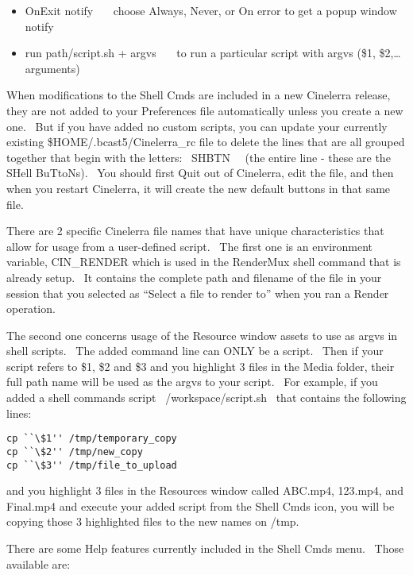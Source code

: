 \begin{itemize}[nosep]
	\item OnExit notify \ \ \  choose Always, Never, or On error to get a popup window notify
	\item run path/script.sh + argvs \ \ \ to run a particular script with argvs (\$1, \$2,{\dots} arguments)
\end{itemize}


{\ttfamily
\textrm{{When modifications to the Shell Cmds are included in a new Cinelerra release, they are not added to your Preferences file automatically unless you create a new one. \ But if you have added no custom scripts, you can update your currently existing \$HOME/.bcast5/Cinelerra\_rc file to delete the lines that are all grouped together that begin with the letters: \ SHBTN \ \ (the entire line - these are the SHell BuTtoNs). \ You should first Quit out of Cinelerra, edit the file, and then when you restart Cinelerra, it will create the new default buttons in that same file.}}}
\medskip

There are 2 specific Cinelerra file names that have unique characteristics that allow for usage from a user-defined
script. \ The first one is an environment variable, CIN\_RENDER which is used in the RenderMux shell command that is already setup. \ It contains the complete path and filename of the file in your session that you selected as ``Select a file to render to'' when you ran a Render operation.
\medskip

The second one concerns usage of the Resource window assets to use as argvs in shell scripts. \ The added command line
can ONLY be a script. \ Then if your script refers to \$1, \$2 and \$3 and you highlight 3 files in the Media folder,
their full path name will be used as the argvs to your script. \ For example, if you added a shell commands script
\ /workspace/script.sh \ that contains the following lines:

\begin{lstlisting}[numbers=none,xleftmargin=10mm]
cp ``\$1'' /tmp/temporary_copy
cp ``\$2'' /tmp/new_copy
cp ``\$3'' /tmp/file_to_upload
\end{lstlisting}

and you highlight 3 files in the Resources window called ABC.mp4, 123.mp4, and Final.mp4 and execute your added script
from the Shell Cmds icon, you will be copying those 3 highlighted files to the new names on /tmp.
\medskip

There are some Help features currently included in the Shell Cmds menu. \ Those available are:
\medskip


